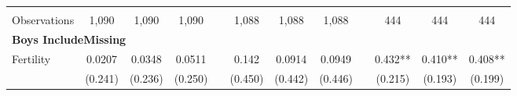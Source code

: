 \begin{landscape}
\begin{table}[htpb!]
\begin{center}
\begin{tabular}{lcccp{2mm}cccp{2mm}ccc}
\begin{footnotesize}\end{footnotesize}&\begin{footnotesize}\end{footnotesize}&\begin{footnotesize}\end{footnotesize}&\begin{footnotesize}\end{footnotesize}&\begin{footnotesize}\end{footnotesize}&\begin{footnotesize}\end{footnotesize}&\begin{footnotesize}\end{footnotesize}&\begin{footnotesize}\end{footnotesize}&\begin{footnotesize}\end{footnotesize}&\begin{footnotesize}\end{footnotesize}&\begin{footnotesize}\end{footnotesize}&\begin{footnotesize}\end{footnotesize}\\Observations&1,090&1,090&1,090&&1,088&1,088&1,088&&444&444&444\\
\multicolumn{12}{l}{\textbf{Boys IncludeMissing}}\\ 
Fertility&0.0207&0.0348&0.0511&&0.142&0.0914&0.0949&&0.432**&0.410**&0.408**\\
&(0.241)&(0.236)&(0.250)&&(0.450)&(0.442)&(0.446)&&(0.215)&(0.193)&(0.199)\\

\end{tabular}
\end{center}
\end{table}
\end{landscape}
